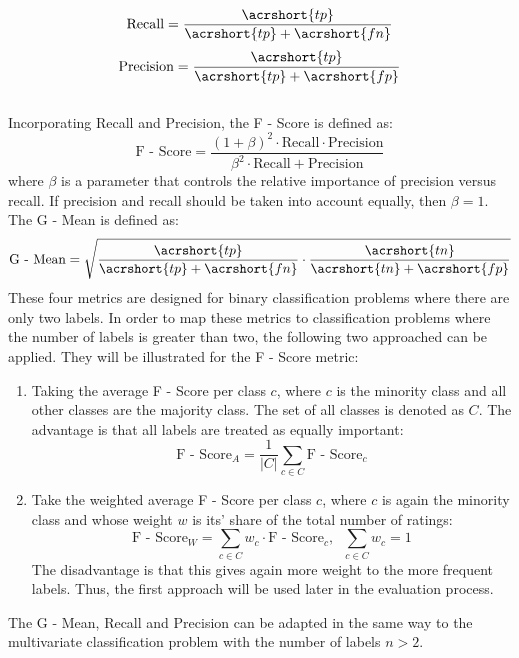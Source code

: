 \begin{equation}
    \text{Recall} = \frac{\acrshort{tp}}{\acrshort{tp} + \acrshort{fn}}
\end{equation}
\begin{equation}
    \text{Precision} = \frac{\acrshort{tp}}{\acrshort{tp} + \acrshort{fp}}
\end{equation}\\
Incorporating Recall and Precision, the F - Score is defined as:\\
\begin{equation}
    \text{F - Score} = \frac{(1 + \beta)^{2} \cdot \text{Recall} \cdot \text{Precision}}{\beta^{2} \cdot \text{Recall} + \text{Precision}}
\end{equation}
where $\beta$ is a parameter that controls the relative importance of precision versus recall. If precision and recall should be taken into account equally, then $\beta = 1$.\\
The G - Mean is defined as:\\
\begin{equation}
    \text{G - Mean} = \sqrt{\frac{\acrshort{tp}}{\acrshort{tp} + \acrshort{fn}} \cdot \frac{\acrshort{tn}}{\acrshort{tn} + \acrshort{fp}}}
\end{equation}
These four metrics are designed for binary classification problems where there are only two labels. In order to map these metrics to classification problems where the number of labels is greater than two, the following two approached can be applied. They will be illustrated for the F - Score metric:
\begin{enumerate}
    \item Taking the average F - Score per class $c$, where $c$ is the minority class and all other classes are the majority class. The set of all classes is denoted as $C$. The advantage is that all labels are treated as equally important:
    \begin{equation}
        \text{F - Score}_A = \frac{1}{|C|}\sum_{c \in C} \text{F - Score}_c
    \end{equation}
    \item Take the weighted average F - Score per class $c$, where $c$ is again the minority class and whose weight $w$ is its' share of the total number of ratings:
    \begin{equation}
        \text{F - Score}_W = \sum_{c \in C} w_c \cdot \text{F - Score}_c , \;\;\sum_{c \in C} w_c = 1
    \end{equation}
    The disadvantage is that this gives again more weight to the more frequent labels. Thus, the first approach will be used later in the evaluation process.
\end{enumerate}
The G - Mean, Recall and Precision can be adapted in the same way to the multivariate classification problem with the number of labels $n > 2$. 

